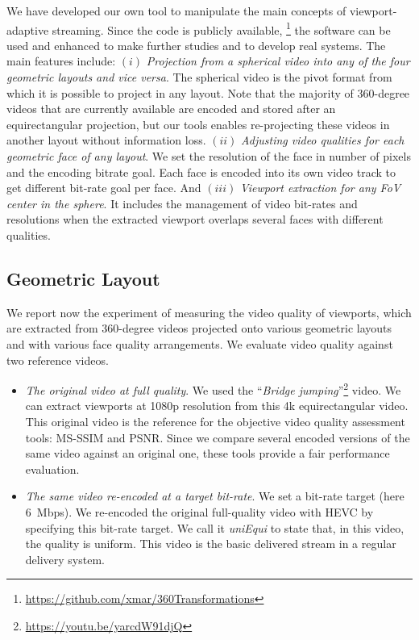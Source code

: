 We have developed our own tool to manipulate the main concepts
of viewport-adaptive streaming. Since the code is publicly available,%
\footnote{\url{https://github.com/xmar/360Transformations}} the software can be used and enhanced
to make further studies and to develop real systems. The main
features include: $(i)$ \emph{Projection from a spherical video into any of the four
geometric layouts and vice versa}. The spherical video is the pivot format from which it
is possible to project in any layout.
Note that the majority of 360-degree videos that are currently available are encoded and stored after
an equirectangular projection, but our tools enables re-projecting these videos
in another layout without information loss. $(ii)$ \emph{Adjusting video qualities for each 
geometric face of any
layout}. We set the resolution of the face in number of
pixels and the encoding bitrate goal. Each face is encoded into its own video
track to get different
bit-rate goal per face. And $(iii)$ \emph{Viewport extraction for any \ac{FoV} center in the
sphere}. It includes the management of video bit-rates and resolutions
when the extracted viewport overlaps several faces with different qualities.

\subsection{Geometric Layout}

We report now the experiment of measuring the video quality of viewports, which
are extracted from 360-degree videos projected onto various geometric layouts and 
with various
face quality arrangements. We evaluate video quality against two reference videos.
\begin{itemize}[leftmargin=7pt, itemindent=0pt, topsep=2pt, itemsep=0pt]	
\item \emph{The original video at full quality}. We used the
``\emph{Bridge
jumping}''\footnote{\url{https://youtu.be/yarcdW91djQ}} video. We can extract viewports at 1080p resolution from this 4k equirectangular
video. This original video 
is the reference for the objective video quality assessment tools: \ac{MS-SSIM} and
\ac{PSNR}. Since we compare several encoded versions of the same video against an original
one, these tools provide
a fair performance evaluation.
\item \emph{The same video re-encoded at a target bit-rate}. We set
a bit-rate target (here \SI{6}{\mega bps}). We 
re-encoded the original full-quality video with \ac{HEVC} by specifying this bit-rate target. We call it \emph{uniEqui} to state that, in this
video, the quality is uniform. This video is the basic delivered stream in a regular delivery
system.
\end{itemize}


